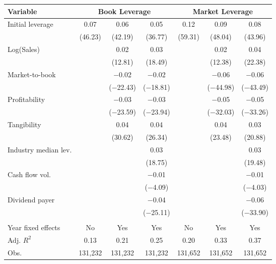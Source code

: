\begin{tabular}{l*{6}{c}}
\toprule
Variable & \multicolumn{3}{c}{Book Leverage} & \multicolumn{3}{c}{Market Leverage} \\ \midrule
Initial leverage&        0.07&        0.06&        0.05&        0.12&        0.09&        0.08\\
            &     (46.23)&     (42.19)&     (36.77)&     (59.31)&     (48.04)&     (43.96)\\
\addlinespace
Log(Sales)  &            &        0.02&        0.03&            &        0.02&        0.04\\
            &            &     (12.81)&     (18.49)&            &     (12.38)&     (22.38)\\
\addlinespace
Market-to-book&            &     $-$0.02&     $-$0.02&            &     $-$0.06&     $-$0.06\\
            &            &  ($-$22.43)&  ($-$18.81)&            &  ($-$44.98)&  ($-$43.49)\\
\addlinespace
Profitability&            &     $-$0.03&     $-$0.03&            &     $-$0.05&     $-$0.05\\
            &            &  ($-$23.59)&  ($-$23.94)&            &  ($-$32.03)&  ($-$33.26)\\
\addlinespace
Tangibility &            &        0.04&        0.04&            &        0.04&        0.03\\
            &            &     (30.62)&     (26.34)&            &     (23.48)&     (20.88)\\
\addlinespace
Industry median lev.&            &            &        0.03&            &            &        0.03\\
            &            &            &     (18.75)&            &            &     (19.48)\\
\addlinespace
Cash flow vol.&            &            &     $-$0.01&            &            &     $-$0.01\\
            &            &            &   ($-$4.09)&            &            &   ($-$4.03)\\
\addlinespace
Dividend payer&            &            &     $-$0.04&            &            &     $-$0.06\\
            &            &            &  ($-$25.11)&            &            &  ($-$33.90)\\
\\
Year fixed effects&          No&         Yes&         Yes&          No&         Yes&         Yes\\
Adj. $ R^2$ &        0.13&        0.21&        0.25&        0.20&        0.33&        0.37\\
Obs.        &     131,232&     131,232&     131,232&     131,652&     131,652&     131,652\\
\bottomrule
\end{tabular}
